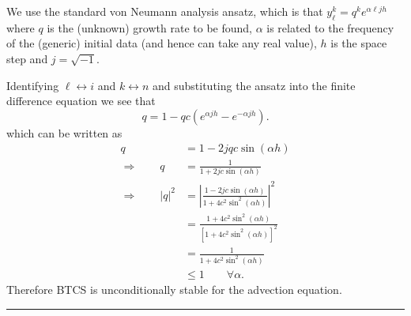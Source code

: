 \documentclass[10pt]{article}
\begin{document}
\begin{enumerate}
  We use the standard von Neumann analysis ansatz, which is that
  $y_{\ell}^k = q^k e^{\alpha \ell j h}$ where $q$ is the (unknown)
  growth rate to be found, $\alpha$ is related to the frequency of the
  (generic) initial data (and hence can take any real value), $h$ is
  the space step and $j = \sqrt{-1}$.

  Identifying $\ell \leftrightarrow i$ and $k \leftrightarrow n$ and
  substituting the ansatz into the finite difference equation we see
  that
  \begin{equation*}
    q = 1 - q c \left( e^{\alpha j h} - e^{- \alpha j h} \right).
  \end{equation*}
  which can be written as
  \begin{align*}
    q & = 1 - 2 j q c \sin \left(\alpha h \right) \\
    \Rightarrow \qquad q & = \frac{1}{1 + 2 j c \sin \left( \alpha h
      \right)} \\
    \Rightarrow \qquad |q|^2 & = \left| \frac{1 - 2 j c \sin \left(
          \alpha h \right)}{1 + 4 c^2 \sin^2 \left( \alpha h \right)}
    \right|^2 \\
    & = \frac{1 + 4 c^2 \sin^2 \left( \alpha h \right)}{\left[ 1 + 4
        c^2 \sin^2 \left( \alpha h \right) \right]^2} \\
    & = \frac{1}{1 + 4 c^2 \sin^2 \left( \alpha h \right)} \\
    & \le 1 \qquad \forall \alpha.
  \end{align*}
  Therefore BTCS is unconditionally stable for the advection equation.
  \begin{center}
    \rule{0.9\textwidth}{.1pt}
  \end{center}
\end{enumerate}
\end{document}

